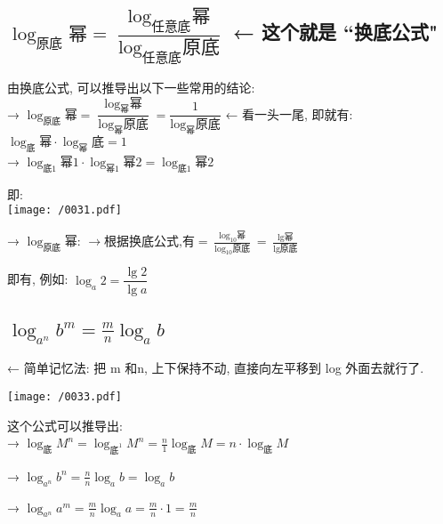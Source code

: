 \documentclass[UTF8]{ctexart}
\begin{document}
\dotfill

\subsection{$\boxed{\log _{\text{原底}}\text{幂}=\dfrac{\log _{\text{任意底}}\text{幂}}{\log _{\text{任意底}}\text{原底}}}$ ← 这个就是 ``换底公式"}

由换底公式, 可以推导出以下一些常用的结论: \\

→  $\log _{\text{原底}}\text{幂}=\dfrac{\log _{\text{幂}}\text{幂}}{\log _{\text{幂}}\text{原底}}=\dfrac{1}{\log _{\text{幂}}\text{原底}}$ 
← 看一头一尾, 即就有: $\boxed{\log _{\text{底}}\text{幂}\cdot \log _{\text{幂}}\text{底}=1}$
\\

→ $ \boxed{\log _{\text{底}1}\text{幂}1\cdot \log _{\text{幂}1}\text{幂}2=\log _{\text{底}1}\text{幂}2 }$

即: \\
\texttt{[image: /0031.pdf]}



→ $ \boxed{\log _{\text{原底}}\text{幂:\ }\rightarrow \text{根据换底公式,有}=\frac{\log _{10}\text{幂}}{\log _{10}\text{原底}}=\frac{\lg\text{幂}}{\lg\text{原底}}
}$

即有, 例如: $\log _a2=\dfrac{\lg 2}{\lg a} $



\dotfill



\subsection{$\log _{a^n}b^m=\frac{m}{n}\log _ab $}

← 简单记忆法: 把 m 和n, 上下保持不动, 直接向左平移到 log 外面去就行了. \\

\begin{myEnvSample}
\texttt{[image: /0033.pdf]}
\end{myEnvSample}



这个公式可以推导出: \\


→ $\log _{\text{底}}M^n=\log _{\text{底}^1}M^n=\frac{n}{1}\log _{\text{底}}M=n\cdot \log _{\text{底}}M $

→ $ \log _{a^n}b^n=\frac{n}{n}\log _ab=\log _ab$

→ $\log _{a^n}a^m=\frac{m}{n}\log _aa=\frac{m}{n}\cdot 1=\frac{m}{n} $
\end{document}
